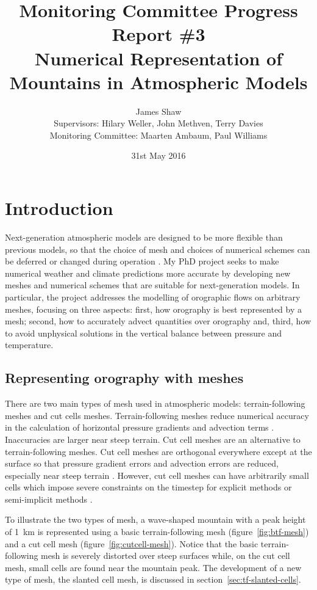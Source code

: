 \documentclass[a4paper,11pt]{article}
\title{
\vspace*{-2em}
Monitoring Committee Progress Report \#3\\
\vspace*{1em}
\Large{Numerical Representation of Mountains in Atmospheric Models}}
\author{James Shaw
\vspace{0.5em} \\
\large{Supervisors: Hilary Weller, John Methven, Terry Davies}
\vspace{0.5em} \\
\large{Monitoring Committee: Maarten Ambaum, Paul Williams}}
\date{31st May 2016}
\begin{document}
\newcommand{\exner}{\Pi}
\maketitle

\section{Introduction}

Next-generation atmospheric models are designed to be more flexible than previous models, so that the choice of mesh and choices of numerical schemes can be deferred or changed during operation \citep{ford2013,theurich2015}.
My PhD project seeks to make numerical weather and climate predictions more accurate by developing new meshes and numerical schemes that are suitable for next-generation models.
In particular, the project addresses the modelling of orographic flows on arbitrary meshes, focusing on three aspects: first, how orography is best represented by a mesh; second, how to accurately advect quantities over orography and, third, how to avoid unphysical solutions in the vertical balance between pressure and temperature.

\subsection*{Representing orography with meshes}

There are two main types of mesh used in atmospheric models: terrain-following meshes and cut cells meshes.
Terrain-following meshes reduce numerical accuracy in the calculation of horizontal pressure gradients \citep{gary1973,zaengl2012} and advection terms \citep{schaer2002}.  Inaccuracies are larger near steep terrain.
Cut cell meshes are an alternative to terrain-following meshes.  Cut cell meshes are orthogonal everywhere except at the surface so that pressure gradient errors and advection errors are reduced, especially near steep terrain \citep{lock2012,good2014}.  However, cut cell meshes can have arbitrarily small cells which impose severe constraints on the timestep for explicit methods or semi-implicit methods \citep{almgren1997}.

To illustrate the two types of mesh, a wave-shaped mountain with a peak height of \SI{1}{\kilo\meter} is represented using a basic terrain-following mesh (figure~\ref{fig:btf-mesh}) and a cut cell mesh (figure~\ref{fig:cutcell-mesh}).  Notice that the basic terrain-following mesh is severely distorted over steep surfaces while, on the cut cell mesh, small cells are found near the mountain peak.
The development of a new type of mesh, the slanted cell mesh, is discussed in section~\ref{sec:tf-slanted-cells}.
\end{document}
